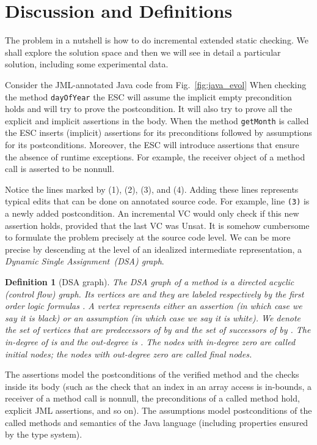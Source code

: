 \documentclass{llncs}
\def\lstinlinen{\lstinline[basicstyle=\normalsize\sffamily]}
\newtheorem{DEF}{Definition}
\def\unsat{{\sc Unsat}}
\begin{document}
\section{Discussion and Definitions}
\label{sec:discussion}

The problem in a nutshell is how to do incremental extended static
checking. We shall explore the solution space and then we will
see in detail a particular solution, including some experimental
data.

Consider the JML-annotated Java code from Fig.~\ref{fig:java_evol} 
When checking the method 
\lstinlinen|dayOfYear| the ESC will assume 
the implicit empty precondition holds and will try to prove the postcondition.
It will also try to prove all the explicit and implicit assertions 
in the body. When the method \lstinlinen|getMonth| is called the
ESC inserts (implicit) assertions for its preconditions followed
by assumptions for its postconditions. Moreover, the ESC will
introduce assertions that ensure the absence of runtime exceptions.
For example, the receiver object of a method call is asserted
to be nonnull.

Notice the lines marked by (1), (2), (3), and (4). Adding these
lines represents typical edits that can be done on annotated source code.
For example, line \lstinlinen|(3)| is a newly added postcondition.
An incremental VC would only check if this new assertion
holds, provided that the last VC was \unsat. It is somehow cumbersome to
formulate the problem precisely at the source code level. We can be
more precise by descending at the level of an idealized
intermediate representation, a \emph{Dynamic Single Assignment~(DSA)
graph}.

\begin{DEF}[DSA graph]
The \emph{DSA graph} of a method is a directed acyclic (control 
flow) graph. Its vertices are  and they
are labeled respectively by the first order logic formulas
. A vertex represents either an \emph{assertion}
(in which case we say it is \emph{black}) or an \emph{assumption}
(in which case we say it is \emph{white}). 
We denote the set
of vertices that are predecessors of  by  and the
set of successors of  by . The \emph{in-degree}
of  is  and the \emph{out-degree} is .
The nodes with in-degree zero are called \emph{initial nodes};
the nodes with out-degree zero are called \emph{final nodes}.
\end{DEF}

\noindent
The assertions model the postconditions of the verified method 
and the checks inside its body (such as the check that an index 
in an array access is in-bounds, a receiver of a method call is 
nonnull, the preconditions of a called method hold, explicit
JML assertions, and so on). The assumptions model postconditions 
of the called methods and semantics of the Java language 
(including properties ensured by the type system). 
\end{document}

